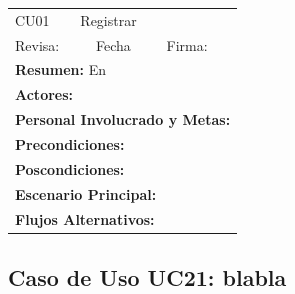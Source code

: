 \begin{longtable}{|l|p{5.5cm}|l|p{2cm}|l|p{1.9cm}|} \hline
    \cellcolor{grisOscuro} CU01 & \multicolumn{4}{|l|}{  \cellcolor{grisOscuro} Registrar} &  \cellcolor{grisClaro}\multirow{2}{1cm}{} \\ \cline{1-5}
    \cellcolor{grisOscuro} Revisa: &  \cellcolor{grisClaro} &  \cellcolor{grisOscuro} Fecha &  \cellcolor{grisClaro} &  \cellcolor{grisOscuro} Firma: & \cellcolor{grisClaro} \\ \hline
    \multicolumn{6}{|p{15cm}|}{ \textbf{Resumen: } En

    } \\ \hline

    \multicolumn{6}{|p{15cm}|}{ \textbf{Actores: }

    } \\ \hline

    \multicolumn{6}{|p{15cm}|}{ \textbf{Personal Involucrado y Metas: }

    } \\ \hline

    \multicolumn{6}{|p{15cm}|}{ \textbf{Precondiciones: }

    } \\ \hline

    \multicolumn{6}{|p{15cm}|}{ \textbf{Poscondiciones: }

    } \\ \hline

    \multicolumn{6}{|p{15cm}|}{ \textbf{Escenario Principal: }

    } \\ \hline

    \multicolumn{6}{|p{15cm}|}{ \textbf{Flujos Alternativos: }

    } \\ \hline

\end{longtable}


\subsection{Caso de Uso UC21: blabla}

